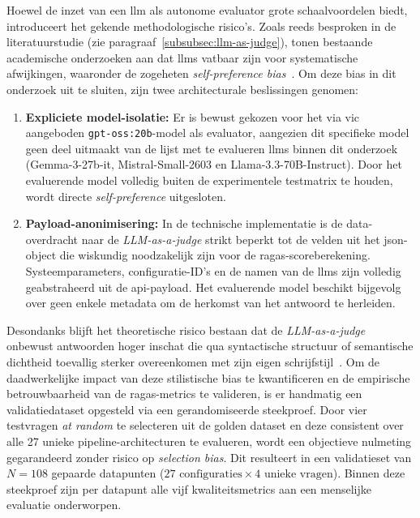 Hoewel de inzet van een \gls{llm} als autonome evaluator grote schaalvoordelen biedt, introduceert het gekende methodologische risico's. Zoals reeds besproken in de literatuurstudie (zie paragraaf~\ref{subsubsec:llm-as-judge}), tonen bestaande academische onderzoeken aan dat \glspl{llm} vatbaar zijn voor systematische afwijkingen, waaronder de zogeheten \textit{self-preference bias}~\autocite{PanEtAl2024}. Om deze bias in dit onderzoek uit te sluiten, zijn twee architecturale beslissingen genomen:

\begin{enumerate}
    \item \textbf{Expliciete model-isolatie:} Er is bewust gekozen voor het via \gls{vic} aangeboden \texttt{gpt-oss:20b}-model als evaluator, aangezien dit specifieke model geen deel uitmaakt van de lijst met te evalueren \glspl{llm} binnen dit onderzoek (Gemma-3-27b-it, Mistral-Small-2603 en Llama-3.3-70B-Instruct). Door het evaluerende model volledig buiten de experimentele testmatrix te houden, wordt directe \textit{self-preference} uitgesloten.
    \item \textbf{Payload-anonimisering:} In de technische implementatie is de data-overdracht naar de \textit{LLM-as-a-judge} strikt beperkt tot de velden uit het \gls{json}-object die wiskundig noodzakelijk zijn voor de \gls{ragas}-scoreberekening. Systeemparameters, configuratie-ID's en de namen van de \glspl{llm} zijn volledig geabstraheerd uit de \gls{api}-payload. Het evaluerende model beschikt bijgevolg over geen enkele metadata om de herkomst van het antwoord te herleiden.
\end{enumerate}

Desondanks blijft het theoretische risico bestaan dat de \textit{LLM-as-a-judge} onbewust antwoorden hoger inschat die qua syntactische structuur of semantische dichtheid toevallig sterker overeenkomen met zijn eigen schrijfstijl~\autocite{PanEtAl2024}. Om de daadwerkelijke impact van deze stilistische bias te kwantificeren en de empirische betrouwbaarheid van de \gls{ragas}-metrics te valideren, is er handmatig een validatiedataset opgesteld via een gerandomiseerde steekproef. Door vier testvragen \textit{at random} te selecteren uit de golden dataset en deze consistent over alle 27 unieke pipeline-architecturen te evalueren, wordt een objectieve nulmeting gegarandeerd zonder risico op \textit{selection bias}. Dit resulteert in een validatieset van $N = 108$ gepaarde datapunten ($27 \text{ configuraties} \times 4 \text{ unieke vragen}$). Binnen deze steekproef zijn per datapunt alle vijf kwaliteitsmetrics aan een menselijke evaluatie onderworpen.

